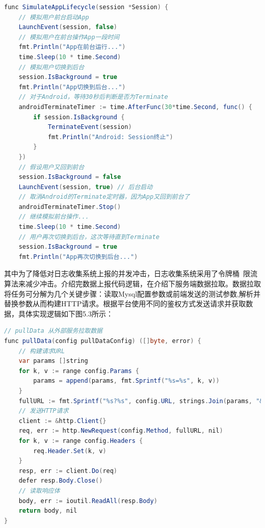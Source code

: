 \begin{longtable}[htbp]
\begin{lrbox}{\kehuduanshangbao}  
\begin{lstlisting}[language=Java]  
func SimulateAppLifecycle(session *Session) {  
	// 模拟用户前台启动App  
	LaunchEvent(session, false)  
	// 模拟用户在前台操作App一段时间  
	fmt.Println("App在前台运行...")  
	time.Sleep(10 * time.Second)  
	// 模拟用户切换到后台  
	session.IsBackground = true  
	fmt.Println("App切换到后台...")  
	// 对于Android，等待30秒后判断是否为Terminate  
	androidTerminateTimer := time.AfterFunc(30*time.Second, func() {  
		if session.IsBackground {  
			TerminateEvent(session)  
			fmt.Println("Android: Session终止")  
		}  
	})  
	// 假设用户又回到前台  
	session.IsBackground = false  
	LaunchEvent(session, true) // 后台启动  
	// 取消Android的Terminate定时器，因为App又回到前台了  
	androidTerminateTimer.Stop()  
	// 继续模拟前台操作...  
	time.Sleep(10 * time.Second)  
	// 用户再次切换到后台，这次等待直到Terminate  
	session.IsBackground = true  
	fmt.Println("App再次切换到后台...")  
\end{lstlisting}  
\end{lrbox} 
\begin{table}[h]   
\caption{客户端数据上报逻辑}  
\label{tab:kehuduanshangbao}  
\usebox{\kehuduanshangbao}  
\end{table}  

其中为了降低对日志收集系统上报的并发冲击，日志收集系统采用了令牌桶~\cite{费嘉2014浅析}限流算法来减少冲击。介绍完数据上报代码逻辑，在介绍下服务端数据拉取。数据拉取将任务可分解为几个关键步骤：读取Mysql配置参数或前端发送的测试参数,解析并替换参数从而构建HTTP请求。根据平台使用不同的鉴权方式发送请求并获取数据，具体实现逻辑如下图5.3所示：

\begin{lrbox}{\pulldatalaqudata}  
\begin{lstlisting}[language=Java]  
// pullData 从外部服务拉取数据  
func pullData(config pullDataConfig) ([]byte, error) {  
	// 构建请求URL  
	var params []string  
	for k, v := range config.Params {  
		params = append(params, fmt.Sprintf("%s=%s", k, v))  
	}  
	fullURL := fmt.Sprintf("%s?%s", config.URL, strings.Join(params, "&"))  
	// 发送HTTP请求  
	client := &http.Client{}  
	req, err := http.NewRequest(config.Method, fullURL, nil)  
	for k, v := range config.Headers {  
		req.Header.Set(k, v)  
	}  
	resp, err := client.Do(req)   
	defer resp.Body.Close()  
	// 读取响应体  
	body, err := ioutil.ReadAll(resp.Body)  
	return body, nil  
}    
\end{lstlisting}  
\end{lrbox} 
\begin{table}[h]   
\caption{数据拉取逻辑代码}  
\label{tab:pulldatalaqudata}  
\usebox{\pulldatalaqudata}  
\end{table}  


\end{longtable}
